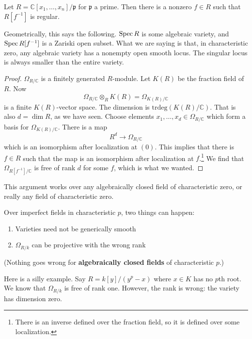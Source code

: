 \begin{corollary} 
Let $R = \mathbb{C}[x_1, \dots, x_n]/\mathfrak{p}$ for $\mathfrak{p}$ a prime.
Then there is a nonzero $f \in R$ such that $R[f^{-1}]$ is regular.
\end{corollary} 
Geometrically, this says the following. $\operatorname{Spec} R$ is some algebraic variety,
and $\operatorname{Spec} R[f^{-1}]$ is a Zariski open subset. What we are saying is that, in
characteristic zero, any algebraic variety has a nonempty open smooth locus.
The singular locus is always smaller than the entire variety.

\begin{proof} 
$\Omega_{R/\mathbb{C}}$ is a finitely generated $R$-module. Let $K(R) $ be the fraction field of $R$.
Now
\[ \Omega_{R/\mathbb{C}} \otimes_R K(R) = \Omega_{K(R)/\mathbb{C}}  \]
is a finite $K(R)$-vector space. The dimension is
$\mathrm{trdeg}(K(R)/\mathbb{C})$. That is also $d=\dim R$, as we have seen.
Choose elements $x_1, \dots, x_d \in \Omega_{R/\mathbb{C}}$ which form a basis
for $\Omega_{K(R)/\mathbb{C}}$. There is a map
\[ R^d \to \Omega_{R/\mathbb{C}}  \]
which is an isomorphism after localization at $(0)$. This implies that there is
$f \in R$ such that the map is an isomorphism after localization at
$f$.\footnote{There is an inverse defined over the fraction field, so it is
defined over some localization.} We find that $\Omega_{R[f^{-1}]/\mathbb{C}}$
is free of rank $d$ for some $f$, which is what we wanted.
\end{proof} 

This argument works over any algebraically closed field of characteristic
zero, or really any field of characteristic zero.
\begin{remark}[Warning] Over imperfect fields in characteristic $p$, two things can happen:
\begin{enumerate}
\item Varieties need not be generically smooth 
\item $\Omega_{R/k}$ can be projective with the wrong rank
\end{enumerate}
(Nothing goes wrong for \textbf{algebraically closed fields} of characteristic
$p$.)
\begin{example} 
Here is a silly example. Say $R = k[y]/(y^p-x)$ where $x \in K$ has no $p$th
root. We know that $\Omega_{R/k}$ is free of rank one. However, the rank is
wrong: the variety has dimension zero.
\end{example} 
\end{remark} 

